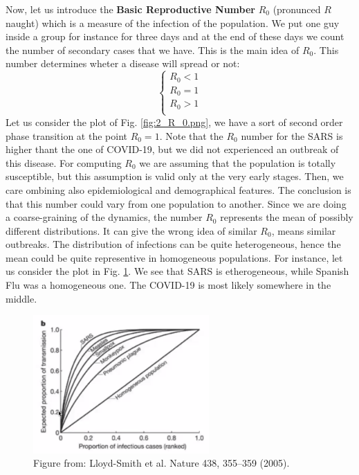 \documentclass[../main/main.tex]{subfiles}
\begin{document}
Now, let us introduce the \textbf{Basic Reproductive Number} \( R_0 \) (pronunced \( R \) naught) which is a measure of the infection of the population. We put one guy inside a group for instance for three days and at the end of these days we count the number of secondary cases that we have. This is the main idea of \( R_0 \). This number determines wheter a disease will spread or not:
  \begin{equation}
    \begin{cases}
     R_0 < 1\\
     R_0 = 1\\
     R_0 > 1\\
    \end{cases}
  \end{equation}
Let us consider the plot of Fig. \ref{fig:2_R_0.png}, we have a sort of second order phase transition at the point \( R_0=1 \).
Note that the \( R_0 \) number for the SARS is higher thant the one of COVID-19, but we did not experienced an outbreak of this disease.
For computing \( R_0 \) we are assuming that the population is totally susceptible, but this assumption is valid only at the very early stages. Then, we care ombining also epidemiological and demographical features. The conclusion is that this number could vary from one population to another.
Since we are doing a coarse-graining of the dynamics, the number \( R_0 \) represents the mean of possibly different distributions. It can give the wrong idea of similar \( R_0 \), means similar outbreaks.
The distribution of infections can be quite heterogeneous, hence the mean could be quite representive in homogeneous populations. For instance, let us consider the plot in Fig. \ref{fig:3_outbreaks}. We see that SARS is etherogeneous, while Spanish Flu was a homogeneous one.
The COVID-19 is most likely somewhere in the middle.

\begin{figure}[h!]
\centering
\includegraphics[width=0.6\textwidth]{../lessons/image/3_outbreaks.png}
\caption{\label{fig:3_outbreaks} Figure from: Lloyd-Smith et al. Nature 438, 355–359 (2005).}
\end{figure}
\end{document}
